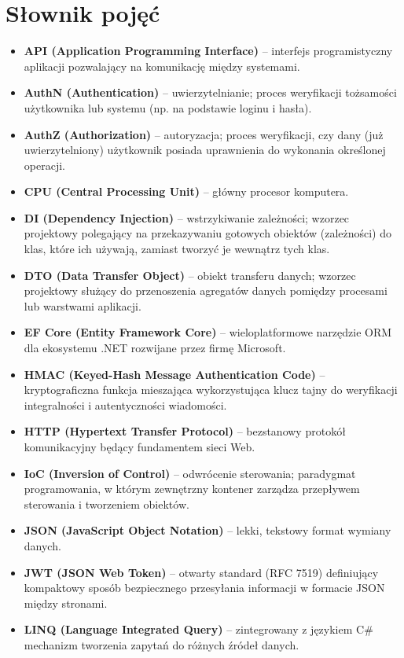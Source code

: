 \documentclass{SGGW-thesis}
\begin{document}
\section*{Słownik pojęć}
\begin{itemize}
    \item \textbf{API (Application Programming Interface)} – interfejs programistyczny aplikacji pozwalający na komunikację między systemami.
    \item \textbf{AuthN (Authentication)} – uwierzytelnianie; proces weryfikacji tożsamości użytkownika lub systemu (np. na podstawie loginu i hasła).
    \item \textbf{AuthZ (Authorization)} – autoryzacja; proces weryfikacji, czy dany (już uwierzytelniony) użytkownik posiada uprawnienia do wykonania określonej operacji.
    \item \textbf{CPU (Central Processing Unit)} – główny procesor komputera.
    \item \textbf{DI (Dependency Injection)} – wstrzykiwanie zależności; wzorzec projektowy polegający na przekazywaniu gotowych obiektów (zależności) do klas, które ich używają, zamiast tworzyć je wewnątrz tych klas.
    \item \textbf{DTO (Data Transfer Object)} – obiekt transferu danych; wzorzec projektowy służący do przenoszenia agregatów danych pomiędzy procesami lub warstwami aplikacji.
    \item \textbf{EF Core (Entity Framework Core)} – wieloplatformowe narzędzie ORM dla ekosystemu .NET rozwijane przez firmę Microsoft.
    \item \textbf{HMAC (Keyed-Hash Message Authentication Code)} – kryptograficzna funkcja mieszająca wykorzystująca klucz tajny do weryfikacji integralności i autentyczności wiadomości.
    \item \textbf{HTTP (Hypertext Transfer Protocol)} – bezstanowy protokół komunikacyjny będący fundamentem sieci Web.
    \item \textbf{IoC (Inversion of Control)} – odwrócenie sterowania; paradygmat programowania, w którym zewnętrzny kontener zarządza przepływem sterowania i tworzeniem obiektów.
    \item \textbf{JSON (JavaScript Object Notation)} – lekki, tekstowy format wymiany danych.
    \item \textbf{JWT (JSON Web Token)} – otwarty standard (RFC 7519) definiujący kompaktowy sposób bezpiecznego przesyłania informacji w formacie JSON między stronami.
    \item \textbf{LINQ (Language Integrated Query)} – zintegrowany z językiem C\# mechanizm tworzenia zapytań do różnych źródeł danych.

\end{itemize}
\end{document}
